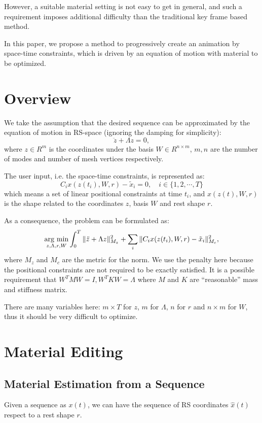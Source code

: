 \documentclass[9pt,twocolumn]{extarticle}
\newcommand{\argmin}{\operatornamewithlimits{arg\ min}}
\begin{document}
However, a suitable material setting is not easy to get in general,
and such a requirement imposes additional difficulty than the
traditional key frame based method.

In this paper, we propose a method to progressively create an
animation by space-time constraints, which is driven by an equation of
motion with material to be optimized.


\section{Overview}
We take the assumption that the desired sequence can be approximated
by the equation of motion in RS-space (ignoring the damping for
simplicity):
\begin{equation}
  \ddot{z} + \Lambda z=0,
\end{equation}
where $z \in R^m$ is the coordinates under the basis $W \in R^{n\times
  m}$, $m,n$ are the number of modes and number of mesh vertices
respectively.

The user input, i.e. the space-time constraints, is represented as:
\begin{equation}\label{opt_ctrl}
  C_ix(z(t_i), W, r) - \tilde{x}_i = 0, \quad i \in \{1, 2, \cdots,
  T\}
\end{equation}
which means a set of linear positional constraints at time $t_i$, and
$x(z(t), W, r)$ is the shape related to the coordinates $z$, basis
$W$ and rest shape $r$.

As a consequence, the problem can be formulated as:
\begin{equation}
  \argmin_{z,\Lambda,r,W} \int_0^T \|\ddot{z} + \Lambda z\|_{M_z}^2 + \sum_i \|C_ix(z(t_i), W, r) - \tilde{x}_i\|_{M_c}^2,
  \label{eq:final_eq}
\end{equation}
where $M_z$ and $M_c$ are the metric for the norm.  We use the penalty
here because the positional constraints are not required to be exactly
satisfied.  It is a possible requirement that $W^TMW=I, W^TKW=\Lambda$
where $M$ and $K$ are ``reasonable'' mass and stiffness matrix.

There are many variables here: $m\times T$ for $z$, $m$ for $\Lambda$,
$n$ for $r$ and $n\times m$ for $W$, thus it should be very difficult
to optimize.  

\section{Material Editing}
\subsection{Material Estimation from a Sequence}
Given a sequence as $x(t)$, we can have the sequence of RS coordinates
$\hat{x}(t)$ respect to a rest shape $r$.
\end{document}

